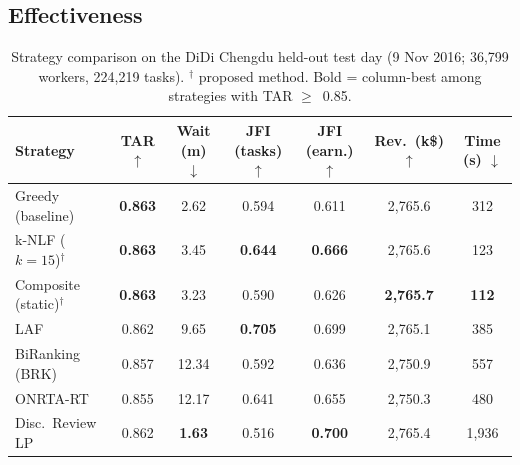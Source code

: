 \subsection{Effectiveness}
\label{sec:overall_results}
\begin{table}[t]
\scriptsize
\renewcommand\arraystretch{1}
\setlength\tabcolsep{2pt}
\caption{Strategy comparison on the DiDi Chengdu held-out test day
  (9 Nov 2016; 36,799 workers, 224,219 tasks).
  $^\dagger$ proposed method. Bold = column-best among strategies with TAR $\geq$~0.85.}
\label{tab:didi_results}
\begin{tabular}{@{}l cccc c c@{}}
\toprule
\textbf{Strategy}
  & \textbf{TAR} $\uparrow$
  & \textbf{Wait (m)} $\downarrow$
  & \textbf{JFI (tasks)} $\uparrow$
  & \textbf{JFI (earn.)} $\uparrow$
  & \textbf{Rev.\ (k\$)} $\uparrow$
  & \textbf{Time (s)} $\downarrow$ \\
\midrule
Greedy (baseline)
  & \textbf{0.863} & 2.62 & 0.594 & 0.611 & 2{,}765.6 & 312 \\
k-NLF ($k{=}15$)$^\dagger$
  & \textbf{0.863} & 3.45 & \textbf{0.644} & \textbf{0.666} & 2{,}765.6 & 123 \\
Composite (static)$^\dagger$
  & \textbf{0.863} & 3.23 & 0.590 & 0.626 & \textbf{2{,}765.7} & \textbf{112} \\
\midrule
LAF
  & 0.862 & 9.65 & \textbf{0.705} & 0.699 & 2{,}765.1 & 385 \\
BiRanking (BRK)
  & 0.857 & 12.34 & 0.592 & 0.636 & 2{,}750.9 & 557 \\
ONRTA-RT
  & 0.855 & 12.17 & 0.641 & 0.655 & 2{,}750.3 & 480 \\
Disc.\ Review LP
  & 0.862 & \textbf{1.63} & 0.516 & \textbf{0.700} & 2{,}765.4 & 1{,}936 \\
\bottomrule
\end{tabular}
\end{table}

